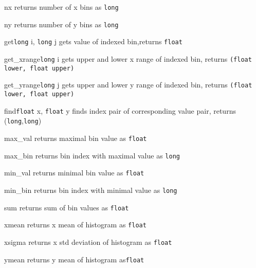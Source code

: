 \begin{methoddesc}{nx}{}
returns number of x bins \hfill as \texttt{long}
\end{methoddesc}
\begin{methoddesc}{ny}{}
returns number of y bins \hfill as \texttt{long}
\end{methoddesc}
\begin{methoddesc}{get}{\texttt{long} i, \texttt{long} j}
gets value of indexed bin,\hfill returns \texttt{float}
\end{methoddesc}
\begin{methoddesc}{get_xrange}{\texttt{long} i}
gets upper and lower x range of indexed bin,
\hfill returns \texttt{(float \textrm{lower}, float \textrm{upper})}
\end{methoddesc}
\begin{methoddesc}{get_yrange}{\texttt{long} j}
gets upper and lower y range of indexed bin,
\hfill returns \texttt{(float \textrm{lower}, float \textrm{upper})}
\end{methoddesc}
\begin{methoddesc}{find}{\texttt{float} x, \texttt{float} y}
finds index pair of corresponding value pair,
\hfill returns (\texttt{long},\texttt{long})
\end{methoddesc}
\begin{methoddesc}{max_val}{}
returns maximal bin value \hfill as \texttt{float}
\end{methoddesc}
\begin{methoddesc}{max_bin}{}
returns bin index with maximal value \hfill as \texttt{long}
\end{methoddesc}
\begin{methoddesc}{min_val}{}
returns minimal bin value \hfill as \texttt{float}
\end{methoddesc}
\begin{methoddesc}{min_bin}{}
returns bin index with minimal value \hfill as \texttt{long}
\end{methoddesc}
\begin{methoddesc}{sum}{}
returns sum of bin values \hfill as \texttt{float}
\end{methoddesc}
\begin{methoddesc}{xmean}{}
returns x mean of histogram \hfill as \texttt{float}
\end{methoddesc}
\begin{methoddesc}{xsigma}{}
returns x std deviation of histogram \hfill as \texttt{float}
\end{methoddesc}
\begin{methoddesc}{ymean}{}
returns y mean of histogram \hfill as\texttt{float}
\end{methoddesc}
